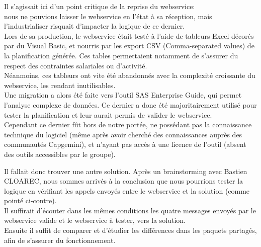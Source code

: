 \documentclass{rapport}
\begin{document}
Il s'agissait ici d'un point critique de la reprise du webservice:\\
nous ne pouvions laisser le webservice en l'état à sa réception, mais l'industrialiser risquait d'impacter la logique de ce dernier.\\

Lors de sa production, le webservice était testé à l'aide de tableurs Excel décorés par du Visual Basic, et nourris par les export CSV (Comma-separated values) de la planification générée. Ces tables permettaient notamment de s'assurer du respect des contraintes salariales ou d'activité.\\
Néanmoins, ces tableurs ont vite été abandonnés avec la complexité croissante du webservice, les rendant inutilisables.\\
Une migration a alors été faite vers l'outil SAS Enterprise Guide, qui permet l'analyse complexe de données. Ce dernier a donc été majoritairement utilisé pour tester la planification et leur aurait permis de valider le webservice.\\
Cependant ce dernier fût hors de notre portée, ne possédant pas la connaissance technique du logiciel (même après avoir cherché des connaissances auprès des communautés Capgemini), et n'ayant pas accès à une licence de l'outil (absent des outils accessibles par le groupe).\\

\begin{minipage}{0.35\textwidth}
Il fallait donc trouver une autre solution. Après un brainstorming avec Bastien CLOAREC, nous sommes arrivés à la conclusion que nous pourrions tester la logique en vérifiant les appels envoyés entre le webservice et la solution (comme pointé ci-contre).\\

Il suffirait d'écouter dans les mêmes conditions les quatre messages envoyés par le webservice valide et le webservice à tester, vers la solution.\\
Ensuite il suffit de comparer et d'étudier les différences dans les paquets partagés, afin de s'assurer du fonctionnement.\\
\end{minipage}
\begin{minipage}{0.55\textwidth}
\end{minipage}
\vspace{5mm} %
\\
\end{document}
